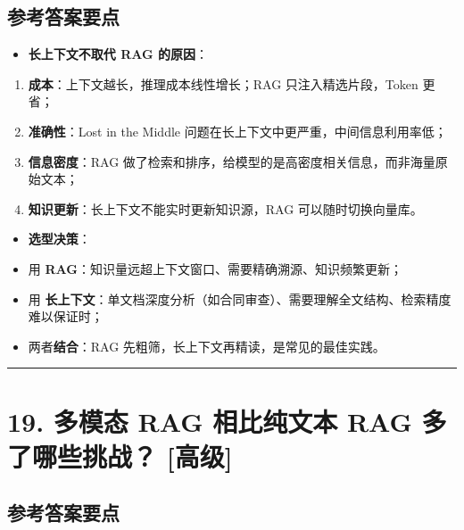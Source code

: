 \documentclass[9pt,a4paper,twocolumn]{ctexart}
\newcommand{\lvgao}{\usebox{\badgegaobox}}
\def\lvgao{[高级]}%
\begin{document}
\subsection*{参考答案要点}

\begin{itemize}[itemsep=1pt, topsep=2pt]
  \item \textbf{长上下文不取代 RAG 的原因}：
\end{itemize}
\begin{enumerate}[itemsep=1pt, topsep=2pt]
  \item \textbf{成本}：上下文越长，推理成本线性增长；RAG 只注入精选片段，Token 更省；
  \item \textbf{准确性}：Lost in the Middle 问题在长上下文中更严重，中间信息利用率低；
  \item \textbf{信息密度}：RAG 做了检索和排序，给模型的是高密度相关信息，而非海量原始文本；
  \item \textbf{知识更新}：长上下文不能实时更新知识源，RAG 可以随时切换向量库。
\end{enumerate}
\begin{itemize}[itemsep=1pt, topsep=2pt]
  \item \textbf{选型决策}：
  \item 用 \textbf{RAG}：知识量远超上下文窗口、需要精确溯源、知识频繁更新；
  \item 用 \textbf{长上下文}：单文档深度分析（如合同审查）、需要理解全文结构、检索精度难以保证时；
  \item 两者\textbf{结合}：RAG 先粗筛，长上下文再精读，是常见的最佳实践。
\end{itemize}


\vspace{2pt}
\noindent\rule{\columnwidth}{0.3pt}\vspace{2pt}



\section*{19. 多模态 RAG 相比纯文本 RAG 多了哪些挑战？ \lvgao{}}


\subsection*{参考答案要点}
\end{document}
